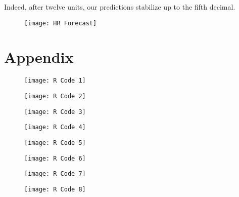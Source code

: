 \documentclass[12pt, letterpaper]{article}
\theoremstyle{definition}
\numberwithin{equation}{section}
\newcommand{\+}[1]{+_{\scalebox{.375}{#1}}}
\newcommand{\1}{\mathbbm{1}}
\begin{document}
Indeed, after twelve units, our predictions stabilize up to the fifth decimal.

\begin{figure}[H]
	\centering
	\texttt{[image: HR Forecast]}
	\label{HR Forecast}
\end{figure}







\newpage
\section{Appendix}
\label{section.appendix}

\begin{figure}[H]
	\centering
	\texttt{[image: R Code 1]}
\end{figure}
\vspace{-1cm}
\begin{figure}[H]
	\centering
	\texttt{[image: R Code 2]}
\end{figure}
\vspace{-1cm}
\begin{figure}[H]
	\centering
	\texttt{[image: R Code 3]}
\end{figure}
\vspace{-1cm}
\begin{figure}[H]
	\centering
	\texttt{[image: R Code 4]}
\end{figure}
\vspace{-1cm}
\begin{figure}[H]
	\centering
	\texttt{[image: R Code 5]}
\end{figure}
\vspace{-1cm}
\begin{figure}[H]
	\centering
	\texttt{[image: R Code 6]}
\end{figure}
\vspace{-1cm}
\begin{figure}[H]
	\centering
	\texttt{[image: R Code 7]}
\end{figure}
\vspace{-1cm}
\begin{figure}[H]
	\centering
	\texttt{[image: R Code 8]}
\end{figure}
\end{document}
